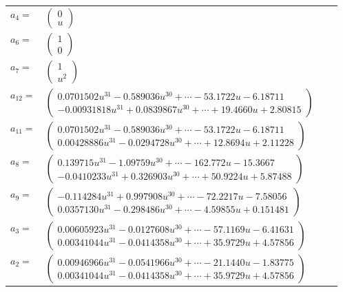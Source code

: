 \documentclass[1p]{elsarticle_modified}
\theoremstyle{definition}
\begin{document}
\begin{tabular}{m{7pt} m{180pt} m{7pt} m{180pt} }
\flushright $a_{4}=$&$\begin{pmatrix}0\\u\end{pmatrix}$ \\
\flushright $a_{6}=$&$\begin{pmatrix}1\\0\end{pmatrix}$ \\
\flushright $a_{7}=$&$\begin{pmatrix}1\\u^2\end{pmatrix}$ \\
\flushright $a_{12}=$&$\begin{pmatrix}0.0701502 u^{31}-0.589036 u^{30}+\cdots-53.1722 u-6.18711\\-0.00931818 u^{31}+0.0839867 u^{30}+\cdots+19.4660 u+2.80815\end{pmatrix}$ \\
\flushright $a_{11}=$&$\begin{pmatrix}0.0701502 u^{31}-0.589036 u^{30}+\cdots-53.1722 u-6.18711\\0.00428886 u^{31}-0.0294728 u^{30}+\cdots+12.8694 u+2.11228\end{pmatrix}$ \\
\flushright $a_{8}=$&$\begin{pmatrix}0.139715 u^{31}-1.09759 u^{30}+\cdots-162.772 u-15.3667\\-0.0410233 u^{31}+0.326903 u^{30}+\cdots+50.9224 u+5.87488\end{pmatrix}$ \\
\flushright $a_{9}=$&$\begin{pmatrix}-0.114284 u^{31}+0.997908 u^{30}+\cdots-72.2217 u-7.58056\\0.0357130 u^{31}-0.298486 u^{30}+\cdots-4.59855 u+0.151481\end{pmatrix}$ \\
\flushright $a_{3}=$&$\begin{pmatrix}0.00605923 u^{31}-0.0127608 u^{30}+\cdots-57.1169 u-6.41631\\0.00341044 u^{31}-0.0414358 u^{30}+\cdots+35.9729 u+4.57856\end{pmatrix}$ \\
\flushright $a_{2}=$&$\begin{pmatrix}0.00946966 u^{31}-0.0541966 u^{30}+\cdots-21.1440 u-1.83775\\0.00341044 u^{31}-0.0414358 u^{30}+\cdots+35.9729 u+4.57856\end{pmatrix}$ \\

\end{tabular}
\end{document}
